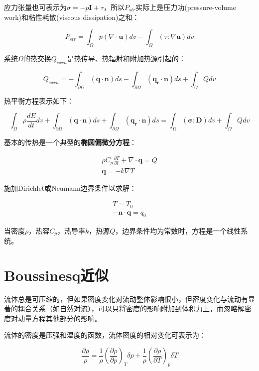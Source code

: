 应力张量也可表示为$\sigma = -p\bm{I}+\tau$，所以$P_{str}$实际上是压力功(pressure-volume work)和粘性耗散(viscous
dissipation)之和：

\begin{equation}
    P_{str} = \int_{\Omega} p(\nabla\cdot \bm{u}) dv - \int_{\Omega}(\tau:\nabla \bm{u}) dv
\end{equation}

系统$\Omega$的热交换$Q_{exch}$是热传导、热辐射和附加热源引起的：

\begin{equation}
    Q_{exch} = - \int_{\partial\Omega} (\bm{q\cdot n}) ds - \int_{\partial\Omega} (\bm{q_r\cdot n}) ds + \int_{\Omega}Q dv
\end{equation}

热平衡方程表示如下：

\begin{equation}
    \int_{\Omega} \rho \frac{dE}{dt} dv + \int_{\partial\Omega} (\bm{q\cdot n}) ds + \int_{\partial\Omega} (\bm{q_r\cdot n}) ds = \int_{\Omega} (\bm{\sigma:D}) dv + \int_{\Omega} Q dv
\end{equation}

基本的传热是一个典型的\textbf{椭圆偏微分方程}：

\begin{gather}
    \rho C_p \frac{\partial T}{\partial t} + \nabla\cdot \bm{q} = Q \\
    \bm{q} = -k \nabla T
\end{gather}

施加Dirichlet或Neumann边界条件以求解：

\begin{gather}
    T = T_0\\
    -\bm{n\cdot q} = q_0
\end{gather}

当密度$\rho$，热容$C_p$，热导率$k$，热源$Q$，边界条件均为常数时，方程是一个线性系统。

\section{Boussinesq近似}

流体总是可压缩的，但如果密度变化对流动整体影响很小，但密度变化与流动有显著的耦合关系（如自然对流），可以只将密度的影响附加到体积力上，而忽略解密度对动量方程其他部分的影响。

流体的密度是压强和温度的函数，流体密度的相对变化可表示为：

\begin{equation}
\frac{\partial \rho}{\rho} = \frac{1}{\rho}\left(\frac{\partial \rho}{\partial p}\right)_T \delta p + \frac{1}{\rho}\left(\frac{\partial \rho}{\partial T}\right)_p \delta T
\end{equation}

